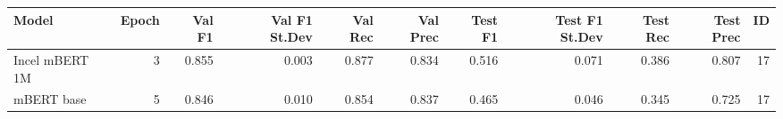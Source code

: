 \begin{tabular}{lrrrrrrrrrr}
\toprule
         Model &  Epoch &  Val F1 &  Val F1 St.Dev &  Val Rec &  Val Prec &  Test F1 &  Test F1 St.Dev &  Test Rec &  Test Prec &  ID \\
\midrule
Incel mBERT 1M &      3 &   0.855 &          0.003 &    0.877 &     0.834 &    0.516 &           0.071 &     0.386 &      0.807 &  17 \\
    mBERT base &      5 &   0.846 &          0.010 &    0.854 &     0.837 &    0.465 &           0.046 &     0.345 &      0.725 &  17 \\
\bottomrule
\end{tabular}
